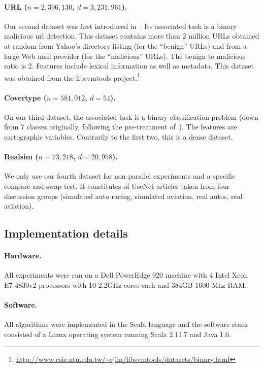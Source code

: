 \documentclass[twoside]{article}
\begin{document}
\paragraph{URL ($n=2,396,130$, $d=3,231,961$).}
Our second dataset was first introduced in~\citet{URL}. Its associated task is a binary malicious url detection.
This dataset contains more than 2 million URLs obtained at random from Yahoo's directory listing (for the ``benign'' URLs) and from a large Web mail provider (for the ``malicious'' URLs).
The benign to malicious ratio is 2.
Features include lexical information as well as metadata.
This dataset was obtained from the libsvmtools project.\footnote{\url{http://www.csie.ntu.edu.tw/~cjlin/libsvmtools/datasets/binary.html}}

\paragraph{Covertype ($n=581,012$, $d=54$).}
On our third dataset, the associated task is a binary classification problem (down from 7 classes originally, following the pre-treatment of~\citet{Covtype}). The features are cartographic variables.
Contrarily to the first two, this is a dense dataset.

\paragraph{Realsim ($n=73,218$, $d=20,958$).}
We only use our fourth dataset for non-parallel experiments and a specific compare-and-swap test.
It constitutes of UseNet articles taken from four discussion groups (simulated auto racing, simulated aviation, real autos, real aviation).


\subsection{Implementation details}
\paragraph{Hardware.} 
All experiments were run on a Dell PowerEdge 920 machine with 4 Intel Xeon E7-4830v2 processors with 10 2.2GHz cores each and 384GB 1600 Mhz RAM.

\paragraph{Software.} \label{scalavsc}
All algorithms were implemented in the Scala language and the software stack consisted of a Linux operating system running Scala 2.11.7 and Java 1.6. 
\end{document}
